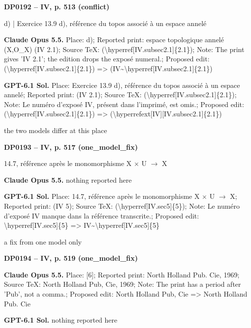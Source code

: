 \par\noindent\hypertarget{DP0192}{}\textbf{DP0192 -- IV, p. 513 (conflict)}\par
d) | Exercice 13.9 d), référence du topos associé à un espace annelé\par
\textbf{Claude Opus 5.5.} Place: d); Reported print: espace topologique annelé (X,O\_X) (IV 2.1); Source TeX: (\textbackslash{}hyperref[IV.subsec2.1]\{2.1\}); Note: The print gives 'IV 2.1'; the edition drops the exposé numeral.; Proposed edit: (\textbackslash{}hyperref[IV.subsec2.1]\{2.1\}) =\allowbreak > (IV\textasciitilde{}\textbackslash{}hyperref[IV.subsec2.1]\{2.1\})\par
\textbf{GPT-6.1 Sol.} Place: Exercice 13.9 d), référence du topos associé à un espace annelé; Reported print: (IV 2.1); Source TeX: (\textbackslash{}hyperref[IV.subsec2.1]\{2.1\}); Note: Le numéro d'exposé IV, présent dans l'imprimé, est omis.; Proposed edit: (\textbackslash{}hyperref[IV.subsec2.1]\{2.1\}) =\allowbreak > (\textbackslash{}hyperrefext[IV][IV.subsec2.1]\{2.1\})\par
the two models differ at this place\par
\par\noindent\hypertarget{DP0193}{}\textbf{DP0193 -- IV, p. 517 (one\_model\_fix)}\par
14.7, référence après le monomorphisme X \ensuremath{\times} U \ensuremath{\to} X\par
\textbf{Claude Opus 5.5.} nothing reported here\par
\textbf{GPT-6.1 Sol.} Place: 14.7, référence après le monomorphisme X \ensuremath{\times} U \ensuremath{\to} X; Reported print: (IV 5); Source TeX: (\textbackslash{}hyperref[IV.sec5]\{5\}); Note: Le numéro d'exposé IV manque dans la référence transcrite.; Proposed edit: \textbackslash{}hyperref[IV.sec5]\{5\} =\allowbreak > IV\textasciitilde{}\textbackslash{}hyperref[IV.sec5]\{5\}\par
a fix from one model only\par
\par\noindent\hypertarget{DP0194}{}\textbf{DP0194 -- IV, p. 519 (one\_model\_fix)}\par
[6]\par
\textbf{Claude Opus 5.5.} Place: [6]; Reported print: North Holland Pub. Cie, 1969; Source TeX: North Holland Pub, Cie, 1969; Note: The print has a period after 'Pub', not a comma.; Proposed edit: North Holland Pub, Cie =\allowbreak > North Holland Pub. Cie\par
\textbf{GPT-6.1 Sol.} nothing reported here\par
